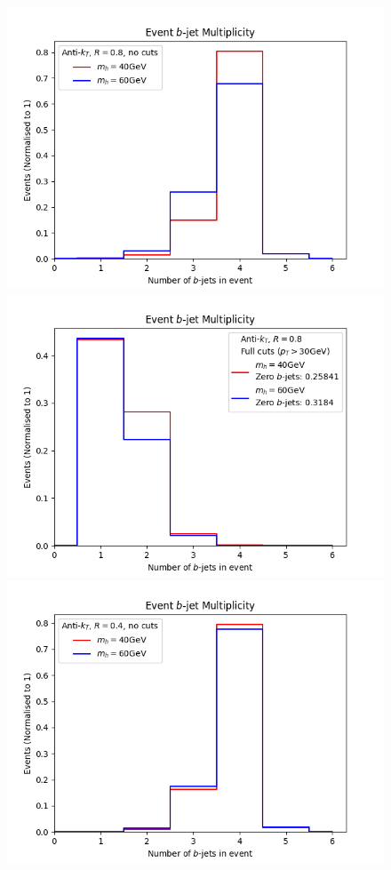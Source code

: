 \documentclass[12pt]{article}
\begin{document}
\begin{figure}[t!]
	\includegraphics[scale=0.5]{plots/nbjets_AK8_nocuts.png}
	\includegraphics[scale=0.5]{plots/nbjets_AK8_pt30.png}
	\includegraphics[scale=0.5]{plots/nbjets_AK4_nocuts.png}

\end{figure}
\end{document}
